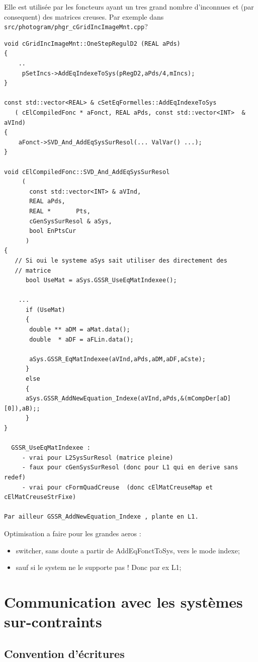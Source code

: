 Elle est utilis\'ee par les foncteurs ayant un tres grand nombre d'inconnues
et (par consequent) des matrices creuses. Par exemple dans
{\tt src/photogram/phgr\_cGridIncImageMnt.cpp}?


{\small
\begin{verbatim}
void cGridIncImageMnt::OneStepRegulD2 (REAL aPds)
{
    ..
     pSetIncs->AddEqIndexeToSys(pRegD2,aPds/4,mIncs);
}

const std::vector<REAL> & cSetEqFormelles::AddEqIndexeToSys
   ( cElCompiledFonc * aFonct, REAL aPds, const std::vector<INT>  & aVInd)
{
    aFonct->SVD_And_AddEqSysSurResol(... ValVar() ...);
}

void cElCompiledFonc::SVD_And_AddEqSysSurResol
     (
	   const std::vector<INT> & aVInd,
	   REAL aPds,
	   REAL *       Pts,
	   cGenSysSurResol & aSys,
	   bool EnPtsCur
      )
{
   // Si oui le systeme aSys sait utiliser des directement des
   // matrice
      bool UseMat = aSys.GSSR_UseEqMatIndexee();

    ...
      if (UseMat)
      {
	   double ** aDM = aMat.data();
	   double  * aDF = aFLin.data();

	   aSys.GSSR_EqMatIndexee(aVInd,aPds,aDM,aDF,aCste);
      }
      else
      {
	  aSys.GSSR_AddNewEquation_Indexe(aVInd,aPds,&(mCompDer[aD][0]),aB);;
      }
}

  GSSR_UseEqMatIndexee :
     - vrai pour L2SysSurResol (matrice pleine)
     - faux pour cGenSysSurResol (donc pour L1 qui en derive sans redef)
     - vrai pour cFormQuadCreuse  (donc cElMatCreuseMap et cElMatCreuseStrFixe)

Par ailleur GSSR_AddNewEquation_Indexe , plante en L1.
\end{verbatim}
}

Optimisation a faire pour les grandes aeros :

\begin{itemize}
   \item   switcher, sans doute a partir de AddEqFonctToSys, vers le
   mode indexe;
    \item sauf si le system ne le supporte pas ! Donc par ex L1;
\end{itemize}


\section{Communication avec les syst\`emes sur-contraints}

\subsection{Convention d'\'ecritures}

